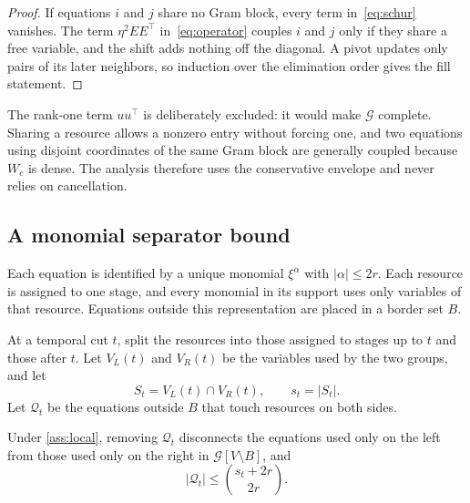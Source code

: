 \begin{proof}
If equations $i$ and $j$ share no Gram block, every term in~\eqref{eq:schur}
vanishes. The term $\eta^2EE^\top$ in~\eqref{eq:operator} couples $i$ and $j$ only
if they share a free variable, and the shift adds nothing off the diagonal. A
pivot updates only pairs of its later neighbors, so induction over the elimination
order gives the fill statement.
\end{proof}

The rank-one term $uu^\top$ is deliberately excluded: it would make $\mathcal G$
complete. Sharing a resource allows a nonzero entry without forcing one, and two
equations using disjoint coordinates of the same Gram block are generally coupled
because $W_c$ is dense. The analysis therefore uses the conservative envelope and
never relies on cancellation.

\subsection{A monomial separator bound}

\begin{assumption}\label{ass:local}
Each equation is identified by a unique monomial $\xi^\alpha$ with
$|\alpha|\le2r$. Each resource is assigned to one stage, and every monomial in its
support uses only variables of that resource. Equations outside this
representation are placed in a border set $B$.
\end{assumption}

At a temporal cut $t$, split the resources into those assigned to stages up to
$t$ and those after $t$. Let $V_L(t)$ and $V_R(t)$ be the variables used by the two
groups, and let
\begin{equation}\label{eq:shared}
S_t=V_L(t)\cap V_R(t),\qquad s_t=|S_t|.
\end{equation}
Let $\mathcal Q_t$ be the equations outside $B$ that touch resources on both sides.

\begin{theorem}\label{thm:monomial}
Under \cref{ass:local}, removing $\mathcal Q_t$ disconnects the equations used only
on the left from those used only on the right in $\mathcal G[V\setminus B]$, and
\begin{equation}\label{eq:monomial}
|\mathcal Q_t|\le\binom{s_t+2r}{2r}.
\end{equation}
\end{theorem}

